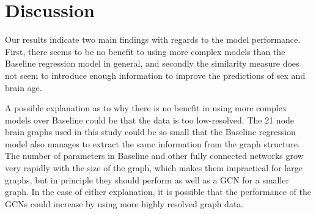 \chapter{Discussion}
\label{chap:discussion}
    
Our results indicate two main findings with regards to the model performance. First, there seems to be no benefit to using more complex models than the Baseline regression model in general, and secondly the similarity measure does not seem to introduce enough information to improve the predictions of sex and brain age.


A possible explanation as to why there is no benefit in using more complex models over Baseline could be that the data is too low-resolved. The 21 node brain graphs used in this study could be so small that the Baseline regression model also manages to extract the same information from the graph structure. The number of parameters in Baseline and other fully connected networks grow very rapidly with the size of the graph, which makes them impractical for large graphs, but in principle they should perform as well as a GCN for a smaller graph. In the case of either explanation, it is possible that the performance of the GCNs could increase by using more highly resolved graph data.

